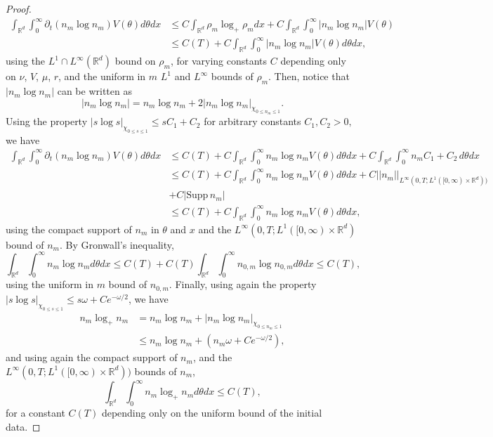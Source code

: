 \documentclass{amsart}
\def\R{\mathbb R}
\def\supp{\mathrm{Supp}\,}
\begin{document}
\begin{proof}
\begin{align*}
   \int_{\R^d}\int_{0}^{\infty}\partial_t(n_m \log n_m)V(\theta)d\theta dx &\leq C\int_{\R^d} \rho_m \log_+ \rho_mdx +C\int_{\R^d}\int_{0}^{\infty}|n_m \log n_m|V(\theta) \\&\leq C(T)+C\int_{\R^d}\int_{0}^{\infty}|n_m \log n_m|V(\theta)d\theta dx,
   \end{align*}
   using the $L^1 \cap L^\infty(\R^d)$ bound on $\rho_m$, for varying constants $C$ depending only on $\nu$, $V$, $\mu$, $r$, and the uniform in $m$ $L^1$ and $L^\infty$ bounds of $\rho_m.$ 
   Then, notice that $|n_m\log n_m|$ can be written as
   $$
   |n_m \log n_m|=n_m \log n_m +2|n_m \log n_m|_{\chi_{0\leq n_m \leq 1}}.
   $$
   Using the property $|s\log s|_{\chi_{0\leq s \leq 1}}\leq sC_1+C_2$ for arbitrary constants $C_1, C_2>0,$ we have 
   \begin{align*}
   \int_{\R^d}\int_{0}^{\infty}\partial_t (n_m \log n_m)V(\theta)d\theta dx &\leq C(T)+C\int_{\R^d}\int_{0}^{\infty}n_m \log n_m V(\theta)d\theta dx + C\int_{\R^d}\int_{0}^{\infty}n_m C_1 + C_2\,d\theta dx \\
   &\leq C(T)+C\int_{\R^d}\int_{0}^{\infty}n_m \log n_m V(\theta)d\theta dx +C||n_m||_{L^\infty(0,T;L^1([0,\infty)\times \R^d))}\\&+C|\supp n_m|\\
   &\leq C(T)+C\int_{\R^d}\int_{0}^{\infty}n_m \log n_m V(\theta)d\theta dx,
   \end{align*}
   using the compact support of $n_m$ in $\theta$ and $x$ and the $L^\infty(0,T;L^1( [0,\infty)\times \R^d)$ bound of $n_m$. By Gronwall's inequality,
   $$
   \int_{\R^d}\int_{0}^{\infty}n_m \log n_m d\theta dx \leq C(T)+C(T)\int_{\R^d}\int_{0}^{\infty}n_{0,m}\log n_{0,m}d\theta dx\leq C(T),
   $$
   using the uniform in $m$ bound of $n_{0,m}.$ Finally, using again the property $|s\log s|_{\chi_{0\leq s \leq 1}}\leq s\omega +Ce^{-\omega/2}$, we have
   \begin{align*}
       n_m \log_+ n_m& =n_m\log n_m+|n_m \log n_m|_{\chi_{0\leq n_m \leq 1}}\\
       &\leq n_m \log n_m +(n_m \omega +Ce^{-\omega/2}),
   \end{align*}
   and using again the compact support of $n_m$, and the $L^\infty(0,T;L^1([0,\infty)\times \R^d))$ bounds of $n_m$, 
   $$
   \int_{\R^d}\int_{0}^{\infty}n_m \log_+ n_m d\theta dx \leq C(T),
   $$
   for a constant $C(T)$ depending only on the uniform bound of the initial data.
 \end{proof}
\end{document}
